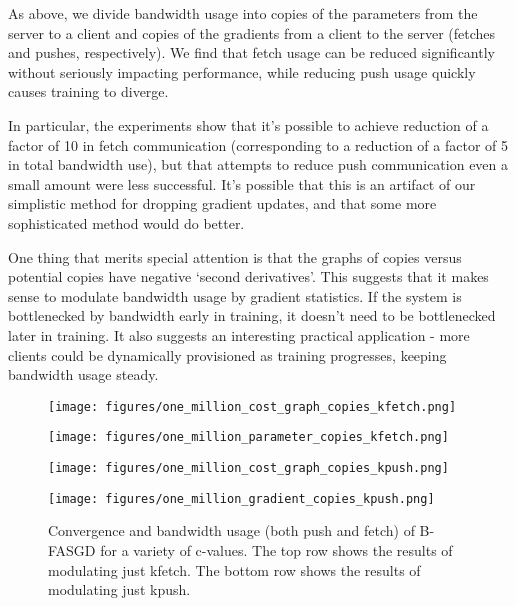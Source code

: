 \documentclass{article} %
\begin{document}
As above, we divide bandwidth usage into copies of the parameters from the server to a client and
copies of the gradients from a client to the server (fetches and pushes, respectively).
We find that fetch usage can be reduced significantly without seriously impacting performance,
while reducing push usage quickly causes training to diverge.

In particular, the experiments show that it's possible to achieve reduction of a factor of
10 in fetch communication (corresponding to a reduction of a factor of 5 in total bandwidth use),
but that attempts to reduce push communication even a small amount were less successful.
It's possible that this is an artifact of our simplistic method for dropping gradient updates,
and that some more sophisticated method would do better.

One thing that merits special attention is that the graphs of copies versus potential
copies have negative `second derivatives'. This suggests that
it makes sense to modulate bandwidth usage by gradient statistics.
If the system is bottlenecked by bandwidth early in training, it doesn't need to be
bottlenecked later in training.
It also suggests an interesting practical application - more clients could
be dynamically provisioned as training progresses, keeping bandwidth usage steady.

\begin{figure}[ht!]
  \centering
  \begin{minipage}[b]{0.5\linewidth}
    \texttt{[image: figures/one\_million\_cost\_graph\_copies\_kfetch.png]}
  \end{minipage}%
  \begin{minipage}[b]{0.5\linewidth}
    \texttt{[image: figures/one\_million\_parameter\_copies\_kfetch.png]}
  \end{minipage} 
  \begin{minipage}[b]{0.5\linewidth}
    \texttt{[image: figures/one\_million\_cost\_graph\_copies\_kpush.png]}
  \end{minipage}%
  \begin{minipage}[b]{0.5\linewidth}
    \texttt{[image: figures/one\_million\_gradient\_copies\_kpush.png]}
  \end{minipage}%
  \caption{
    Convergence and bandwidth usage (both push and fetch)
    of B-FASGD for a variety of c-values.
    The top row shows the results of modulating just kfetch.
    The bottom row shows the results of modulating just kpush.
  }
  \label{bandwidthfig} 
\end{figure}
\end{document}

